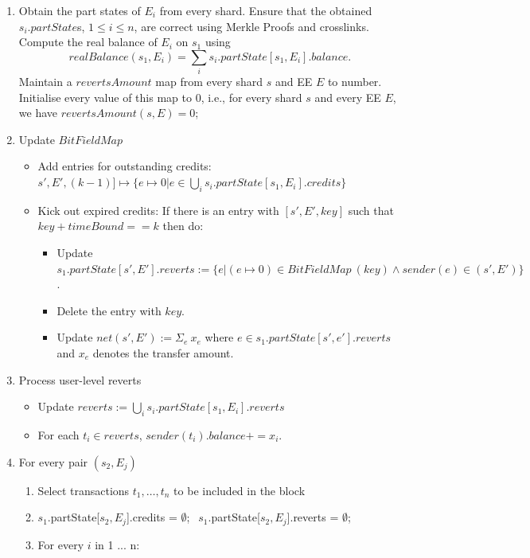 \documentclass{article}
\newcommand{\bitfieldmap}[0]{\ensuremath{BitFieldMap}~}
\begin{document}
\begin{enumerate}
\item Obtain the part states of $E_i$ from every shard. Ensure that the obtained $s_i.partState$s,  $1 \le i \le n$, are correct using Merkle Proofs and crosslinks.
Compute the real balance of $E_i$ on $s_1$ using 
\[
	realBalance(s_1,E_i) = \sum_i s_i.partState[s_1,E_i].balance.
\]
Maintain a $revertsAmount$ map from every shard $s$ and EE $E$ to number.  Initialise every value of this map to $0$, i.e., for every shard $s$ and every EE $E$, we have $revertsAmount(s,E) = 0$;  

\item Update $\bitfieldmap$
    \begin{itemize}
        \item Add entries for outstanding credits: 
        $s', E', (k-1)] \mapsto \{e \mapsto 0 | e \in \bigcup_i s_i.partState[s_1,E_i].credits\}$
        \item Kick out expired credits: If there is an entry with $[s',E',key]$ such that $key + timeBound == k$ then do:
        \begin{itemize}
            \item Update $s_1.partState[s',E'].reverts := \{ e | (e \mapsto 0) \in \bitfieldmap(key) \wedge sender(e) \in (s',E') \}$.
            \item Delete the entry with $key$.
            \item Update $net(s',E') := \Sigma_e ~x_e$ where $e \in s_1.partState[s',e'].reverts$ and $x_e$ denotes the transfer amount.
        \end{itemize}
    \end{itemize}
\item Process user-level reverts
    \begin{itemize}
	    \item Update $reverts := \bigcup_i s_i.partState[s_1,E_i].reverts$
	    \item For each $t_i \in reverts$, $sender(t_i).balance += x_i$.
    \end{itemize}
\item For every pair $(s_2,E_j)$
    \begin{enumerate}
	\item Select transactions $t_1,\ldots,t_n$ to be included in the block
	\item $s_1$.partState[$s_2,E_j$].credits = $\emptyset$;  $~~s_1$.partState[$s_2,E_j$].reverts = $\emptyset$; 
	\item For every $i$ in 1 ... n: 

\end{enumerate}
\end{enumerate}
\end{document}
